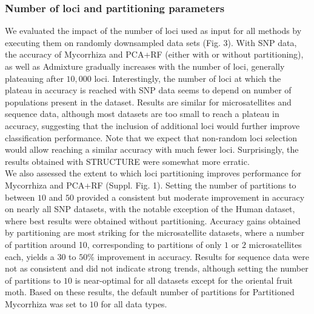 \documentclass{bioinfo}
\begin{document}
\subsubsection{Number of loci  and partitioning parameters}
We evaluated the impact of the number of loci used as input for all methods by executing them on randomly downsampled data sets (Fig. 3). With SNP data, the accuracy of Mycorrhiza and PCA+RF (either with or without partitioning), as well as Admixture gradually increases with the number of loci, generally plateauing after $10,000$ loci. Interestingly, the number of loci at which the plateau in accuracy is reached with SNP data seems to depend on number of populations present in the dataset.
Results are similar for microsatellites and sequence data, although most datasets are too small to reach a plateau in accuracy, suggesting that the inclusion of additional loci would further improve classification performance. Note that we expect that non-random loci selection would allow reaching a similar accuracy with much fewer loci. Surprisingly, the results obtained with STRUCTURE were somewhat more erratic.\\
We also assessed the extent to which loci partitioning improves performance for Mycorrhiza and PCA+RF (Suppl. Fig. 1). Setting the number of partitions to between $10$ and $50$ provided a consistent but moderate improvement in accuracy on nearly all SNP datasets, with the notable exception of the Human dataset, where best results were obtained without partitioning. Accuracy gains obtained by partitioning are most striking for the microsatellite datasets, where a number of partition around 10, corresponding to partitions of only $1$ or $2$ microsatellites each, yields a $30$ to $50\%$ improvement in accuracy. Results for sequence data were not as consistent and did not indicate strong trends, although setting the number of partitions to $10$ is near-optimal for all datasets except for the oriental fruit moth. Based on these results, the default number of partitions for Partitioned Mycorrhiza was set to $10$ for all data types.
\end{document}
